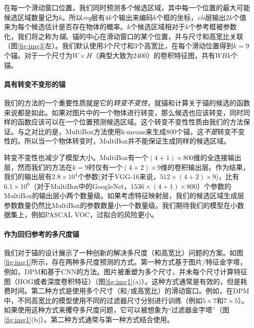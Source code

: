 \documentclass[../main.tex]{subfile}
\begin{document}
在每一个滑动窗口位置，我们同时预测多个候选区域，其中每一个位置的最大可能候选区域数量记为$k$。所以\textit{reg}层有$4k$个输出来编码$k$个框的坐标，\textit{cls}层输出$2k$个值来为每个候选估计是否存在物体的概率。$k$个候选区域相对于$k$个参考框被参数化，我们将之称为\textit{锚}。锚的中心在滑动窗口的某个位置，并与尺寸和高宽比关联（图\ref{fig:img3}左）。我们默认使用3个尺寸和3个高宽比，在每个滑动位置得到$k=9$个锚。对于一个尺寸为$W\times H$（典型大致为2400）的卷积特征图，共有$WHk$个锚。

\paragraph*{具有转变不变形的锚}

我们的方法的一个重要性质就是它的\textit{转变不变性}，就锚和计算关于锚的候选的函数来说都是如此。如果对图片中的一个物体进行转变，那么候选也应该转变，同时同样的函数应该可以在一个位置预测候选区域。这个转变不变性性质由我们的方法保证。与之对比的是，MultiBox方法\cite{multiBox1, multiBox2}使用k-means来生成800个锚，这\textit{不是}转变不变性的。所以当一个物体转变时，MultiBox并不能保证生成同样的候选区域。

转变不变性也减少了模型大小。MultiBox有一个$(4 + 1) \times 800$维的全连接输出层，然而我们的方法在$k=9$时仅有一个$(4 + 2) \times 9$维的卷积输出层。作为结果，我们的输出层有$2.8 \times 10^4$个参数(对于VGG-16来说，$512 \times (4 + 2) \times 9$)，比有$6.1 \times 10^6$（对于MultiBox中的GoogleNet，$1536\times (4+1)\times 800$）个参数的MultiBox的输出层小两个数量级。如果考虑特征映射层，我们的候选区域生成层参数数量仍然比MultiBox的参数数量小一个数量级。我们期待我们的模型在小数据集上，例如PASCAL VOC，过拟合的风险更小。

\paragraph*{作为回归参考的多尺度锚}

我们对于锚的设计展示了一种创新的解决多尺度（和高宽比）问题的方案。如图\ref{fig:img1}所示，存在两种多尺度预测的方式。第一种方式基于图片/特征金字塔，例如，DPM\cite{dpm}和基于CNN的方法\cite{overfeat, rcnn, fastrcnn}。图片被重塑为多个尺寸，并未每个尺寸计算特征图（HOG\cite{dpm}或者深度卷积特征\cite{overfeat, rcnn, fastrcnn}）（图\ref{fig:img1}(a)）。这种方式通常是有效的，但是耗费时间。第二种方式是使用多个尺寸（和/或高宽比）的滑动窗口。例如，在DPM\cite{dpm}中，不同高宽比的模型使用不同的过滤器尺寸分别进行训练（例如$5\times 7$和$7\times 5$）。如果使用这种方式来攫夺多尺度问题，它可以被想象为“过滤器金字塔”（图\ref{fig:img1}(b)）。第二种方式通常与第一种方式结合使用。
\end{document}
